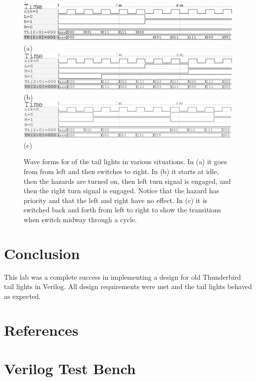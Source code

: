 \documentclass[12pt]{article}
\begin{document}
\begin{figure}
\center
\includegraphics[scale=0.7]{figures/left-right-wave} \\
(a) \\
\includegraphics[scale=0.7]{figures/hazard-wave} \\
(b) \\
\includegraphics[scale=0.7]{figures/left-right-random-wave} \\
(c)
\caption{Wave forms for of the tail lights in various situations.
In (a) it goes from from left and then switches to right.
In (b) it starts at idle, then the hazards are turned on, then
left turn signal is engaged, and then the right turn signal is engaged.
Notice that the hazard has priority and that the left and right have no effect.
In (c) it is switched back and forth from left to right to show the transitions
when switch midway through a cycle.
}
\label{fig:waves}
\end{figure}


\section{Conclusion}

This lab was a complete success in implementing a design for
old Thunderbird tail lights in Verilog.
All design requirements were met and the tail lights behaved as
expected.



\renewcommand*{\refname}{\vspace{-8mm}}
\section{References}



\clearpage
\appendix

\section{Verilog Test Bench}
\label{sec:test}


\end{document}
